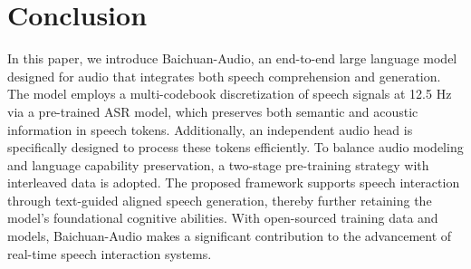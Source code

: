 \section{Conclusion}

In this paper, we introduce Baichuan-Audio, an end-to-end large language model designed for audio that integrates both speech comprehension and generation. The model employs a multi-codebook discretization of speech signals at 12.5 Hz via a pre-trained ASR model, which preserves both semantic and acoustic information in speech tokens. Additionally, an independent audio head is specifically designed to process these tokens efficiently. To balance audio modeling and language capability preservation, a two-stage pre-training strategy with interleaved data is adopted. The proposed framework supports speech interaction through text-guided aligned speech generation, thereby further retaining the model's foundational cognitive abilities. With open-sourced training data and models, Baichuan-Audio makes a significant contribution to the advancement of real-time speech interaction systems.